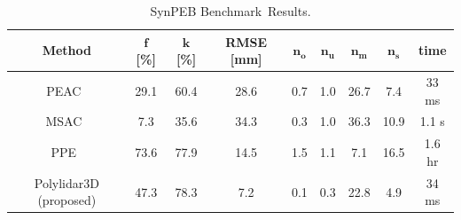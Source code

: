 \begin{table}[H]
\centering
\caption{SynPEB Benchmark~Results.  }
\label{table:synpeb_results}
\begin{tabular}{@{}ccccccccc@{}}
\toprule
\textbf{Method}                                  & $\textbf{f}$ {\textbf{[}}\textbf{\%}{\textbf{]}} & $\textbf{k}$ {\textbf{[}}\textbf{\%}{\textbf{]}} & \textbf{RMSE} {\textbf{[}}\textbf{mm}{\textbf{]}} & $\textbf{n}_\textbf{o}$ & $\textbf{n}_\textbf{u}$ & $\textbf{n}_\textbf{m}$ & $\textbf{n}_\textbf{s}$ & \textbf{time}\\ \midrule
PEAC~\cite{feng_fast_2014}              & 29.1         & 60.4         & 28.6          & 0.7   & 1.0   & 26.7  & 7.4   & 33 ms\\
MSAC~\cite{torr_mlesac_2000}            & 7.3          & 35.6         & 34.3          & 0.3   & 1.0   & 36.3  & 10.9  & 1.1 s\\
PPE~\cite{schaefer_maximum_2019}      & 73.6         & 77.9         & 14.5          & 1.5   & 1.1   & 7.1   & 16.5  & 1.6 hr\\
Polylidar3D (proposed)                  & 47.3         & 78.3         & 7.2           & 0.1   & 0.3   & 22.8  & 4.9  & 34 ms\\ \bottomrule
\end{tabular}
\end{table}







